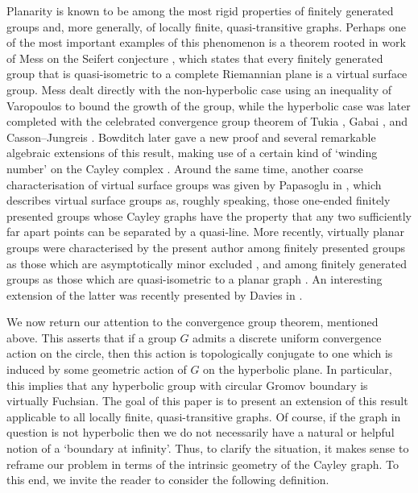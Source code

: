 \documentclass[11pt,a4paper]{amsart}
\theoremstyle{definition}
\begin{document}
Planarity is known to be among the most rigid properties of finitely generated groups and, more generally, of locally finite, quasi-transitive graphs. Perhaps one of the most important examples of this phenomenon is a theorem rooted in work of Mess on the Seifert conjecture \cite{mess1988seifert}, which states that every finitely generated group that is quasi-isometric to a complete Riemannian plane is a virtual surface group. Mess dealt directly with the non-hyperbolic case using an inequality of Varopoulos to bound the growth of the group, while the hyperbolic case was later completed with the celebrated convergence group theorem of Tukia \cite{tukia1988homeomorphic}, Gabai \cite{gabai1992convergence}, and Casson--Jungreis \cite{casson1994convergence}.
Bowditch later gave a new proof and several remarkable algebraic extensions of this result, making use of a certain kind of `winding number' on the Cayley complex \cite{bowditch2004planar}. Around the same time, another coarse characterisation of virtual surface groups was given by Papasoglu in \cite{papasoglu2005quasi}, which describes virtual surface groups as, roughly speaking, those one-ended finitely presented groups whose Cayley graphs have the property that any two sufficiently far apart points can be separated by a quasi-line.
More recently, virtually planar groups were characterised by the present author among finitely presented groups as those which are asymptotically minor excluded \cite{macmanus2025fat}, and among finitely generated groups as those which are quasi-isometric to a planar graph \cite{macmanus2023accessibility}. An interesting extension of the latter was recently presented by Davies in \cite{davies2025string}. 
 
We now return our attention to the convergence group theorem, mentioned above. This asserts that if a group $G$ admits a discrete uniform convergence action on the circle, then this action is topologically conjugate to one which is induced by some geometric action of $G$ on the hyperbolic plane. In particular, this implies that any hyperbolic group with circular Gromov boundary is virtually Fuchsian. 
The goal of this paper is to present an extension of this result applicable to all locally finite, quasi-transitive graphs. Of course, if the graph in question is not hyperbolic then we do not necessarily have a natural or helpful notion of a `boundary at infinity'. Thus, to clarify the situation, it makes sense to reframe our problem in terms of the intrinsic geometry of the Cayley graph.
To this end, we invite the reader to consider the following definition. 
\end{document}
